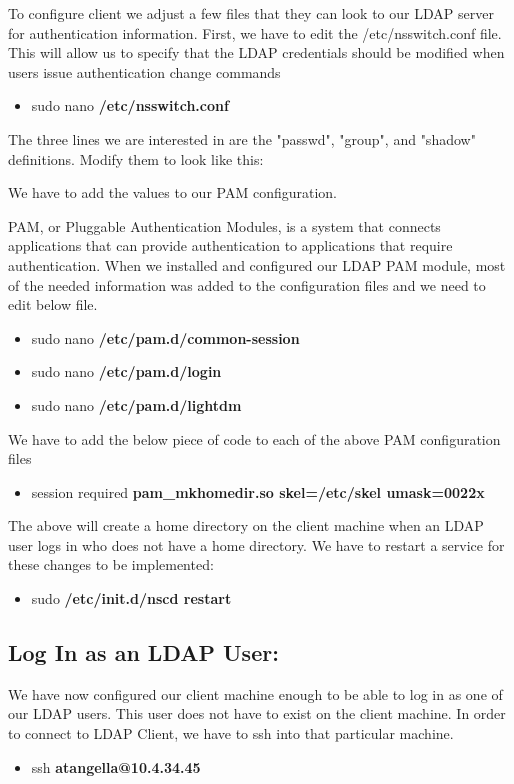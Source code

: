 \documentclass[12pt]{report}
\begin{document}
		To configure client we adjust a few files that they can look to our LDAP server for authentication information.
		First, we have to edit the /etc/nsswitch.conf file. This will allow us to specify that the LDAP credentials should be modified when users issue authentication change commands
		\begin{itemize}
		\item sudo nano \textbf{/etc/nsswitch.conf}
		\end{itemize}
		\pagebreak
		The three lines we are interested in are the "passwd", "group", and "shadow" definitions. 
		Modify them to look like this:
		
		
		We have to add the values to our PAM configuration.
		
		PAM, or Pluggable Authentication Modules, is a system that connects applications that can provide authentication to applications that require authentication.
		When we installed and configured our LDAP PAM module, most of the needed information was added to the configuration files and we need to edit below file.
		\begin{itemize}
		\item sudo nano \textbf{/etc/pam.d/common-session}
		\item sudo nano \textbf{/etc/pam.d/login}
		\item sudo nano \textbf{/etc/pam.d/lightdm}
		\end{itemize}
		
	We have to add the below piece of code to each of the above PAM configuration files
		\begin{itemize}
		\item session required \textbf{pam\_mkhomedir.so skel=/etc/skel umask=0022x}
		\end{itemize}
		
		The above will create a home directory on the client machine when an LDAP user logs in who does not have a home directory.
		We have to restart a service for these changes to be implemented:
		\begin{itemize}
		\item sudo \textbf{/etc/init.d/nscd restart}		
		\end{itemize}
		
		\subsection{Log In as an LDAP User:}
		We have now configured our client machine enough to be able to log in as one of our LDAP users. This user does not have to exist on the client machine.
		In order to connect to LDAP Client, we have to ssh into that particular machine.
		\begin{itemize}
		\item ssh \textbf{atangella@10.4.34.45}
		\end{itemize}
\end{document}
